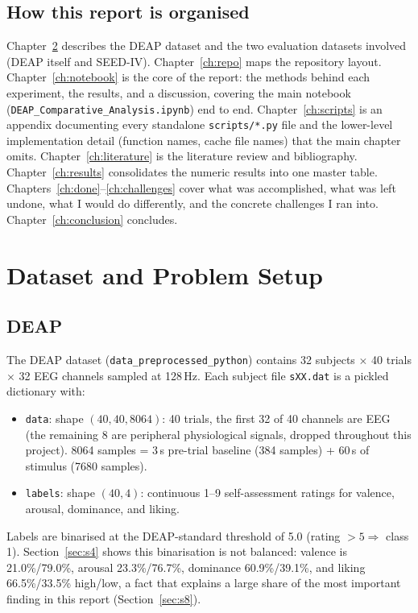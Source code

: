 \documentclass[11pt]{report}
\begin{document}
\section{How this report is organised}
Chapter~\ref{ch:dataset} describes the DEAP dataset and the two evaluation
datasets involved (DEAP itself and SEED-IV). Chapter~\ref{ch:repo} maps the
repository layout. Chapter~\ref{ch:notebook} is the core of the report: the
methods behind each experiment, the results, and a discussion, covering the
main notebook (\texttt{DEAP\_Comparative\_Analysis.ipynb}) end to end.
Chapter~\ref{ch:scripts} is an appendix documenting every standalone
\texttt{scripts/*.py} file and the lower-level implementation detail (function
names, cache file names) that the main chapter omits. Chapter~\ref{ch:literature}
is the literature review and bibliography. Chapter~\ref{ch:results}
consolidates the numeric results into one master table. Chapters~\ref{ch:done}--\ref{ch:challenges}
cover what was accomplished, what was left undone, what I would do
differently, and the concrete challenges I ran into. Chapter~\ref{ch:conclusion}
concludes.

\chapter{Dataset and Problem Setup}
\label{ch:dataset}

\section{DEAP}
The DEAP dataset \citep{koelstra2012deap} (\texttt{data\_preprocessed\_python}) contains 32 subjects
$\times$ 40 trials $\times$ 32 EEG channels sampled at 128\,Hz. Each subject
file \texttt{sXX.dat} is a pickled dictionary with:
\begin{itemize}
  \item \texttt{data}: shape $(40, 40, 8064)$: 40 trials, the first 32 of
        40 channels are EEG (the remaining 8 are peripheral physiological
        signals, dropped throughout this project). 8064 samples = 3\,s
        pre-trial baseline (384 samples) + 60\,s of stimulus (7680 samples).
  \item \texttt{labels}: shape $(40, 4)$: continuous 1--9 self-assessment
        ratings for valence, arousal, dominance, and liking.
\end{itemize}
Labels are binarised at the DEAP-standard threshold of 5.0 (rating $>5 \Rightarrow$
class 1). Section~\ref{sec:s4} shows this binarisation is not
balanced: valence is 21.0\%/79.0\%, arousal 23.3\%/76.7\%, dominance
60.9\%/39.1\%, and liking 66.5\%/33.5\% high/low, a fact that explains a large
share of the most important finding in this report (Section~\ref{sec:s8}).
\end{document}
